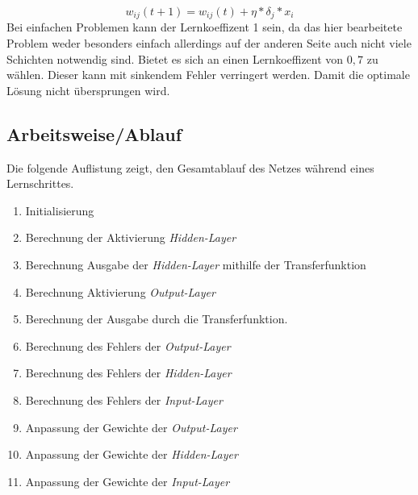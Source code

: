 \begin{equation}
    w_{ij}(t+1) = w_{ij}(t) + \eta * \delta_j*x_i
    \label{eqn:gewichte}
\end{equation}
Bei einfachen Problemen kann der Lernkoeffizent 1 sein, da das hier
bearbeitete Problem weder besonders einfach allerdings auf der anderen Seite auch
nicht viele Schichten notwendig sind. Bietet es sich an einen Lernkoeffizent von
$0,7$ zu wählen. Dieser kann mit sinkendem Fehler verringert werden.
Damit die optimale Lösung nicht übersprungen wird.

\subsection{Arbeitsweise/Ablauf}
Die folgende Auflistung zeigt, den Gesamtablauf des Netzes während eines
Lernschrittes.
\begin{enumerate}
    \item Initialisierung
    \item Berechnung der Aktivierung \textit{Hidden-Layer}
    \item Berechnung Ausgabe der \textit{Hidden-Layer} mithilfe der Transferfunktion
    \item Berechnung Aktivierung \textit{Output-Layer}
    \item Berechnung der Ausgabe durch die Transferfunktion.
    \item Berechnung des Fehlers der \textit{Output-Layer}
    \item Berechnung des Fehlers der \textit{Hidden-Layer}
    \item Berechnung des Fehlers der \textit{Input-Layer}
    \item Anpassung der Gewichte der \textit{Output-Layer}
    \item Anpassung der Gewichte der \textit{Hidden-Layer}
    \item Anpassung der Gewichte der \textit{Input-Layer}
\end{enumerate}